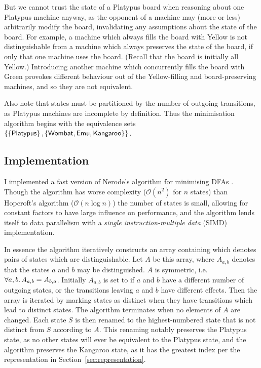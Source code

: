 But we cannot trust the state of a Platypus board when reasoning
about one Platypus machine anyway, as the opponent of a machine may
(more or less) arbitrarily modify the board, invalidating any assumptions
about the state of the board. For example, a machine which always fills
the board with Yellow is not distinguishable from a machine which
always preserves the state of the board, if only that one machine uses the board.
(Recall that the board is initially all Yellow.) Introducing another
machine which concurrently fills the board with Green provokes
different behaviour out of the Yellow-filling and board-preserving
machines, and so they are not equivalent.

Also note that states must be partitioned by the number of outgoing
transitions, as Platypus machines are incomplete by definition. Thus
the minimisation algorithm begins with the equivalence sets
$\left\{ \left\{ \mathsf{Platypus} \right\}, \left\{ \mathsf{Wombat}, \mathsf{Emu}, \mathsf{Kangaroo} \right\} \right\}$.

\subsection{Implementation}

I implemented a fast version of Nerode's algorithm for minimising
DFAs \cite{nerode}. Though the algorithm has worse complexity
($\mathcal{O}(n^2)$ for $n$ states) than Hopcroft's algorithm
($\mathcal{O}(n \log n)$) the number of states is small, allowing for
constant factors to have large influence on performance, and the
algorithm lends itself to data parallelism with a
\emph{single instruction-multiple data} (SIMD) implementation.

In essence the algorithm iteratively constructs an array containing
which denotes pairs of states which are distinguishable. Let $A$ be
this array, where $A_{a, b}$ denotes that the states $a$ and $b$ may
be distinguished. $A$ is symmetric, i.e.
$ \forall a, b\ldotp A_{a, b} = A_{b, a} $. Initially $A_{a, b}$ is set to
if $a$ and $b$ have a different number of outgoing
states, or the transitions leaving $a$ and $b$ have different effects.
Then the array is iterated by marking states as distinct when they
have transitions which lead to distinct states. The algorithm
terminates when no elements of $A$ are changed.
Each state $S$ is then renamed to the highest-numbered state that
is not distinct from $S$ according to $A$. This renaming notably
preserves the Platypus state, as no other states will ever be equivalent
to the Platypus state, and the algorithm preserves the Kangaroo state,
as it has the greatest index per the representation in Section~\ref{sec:representation}.


